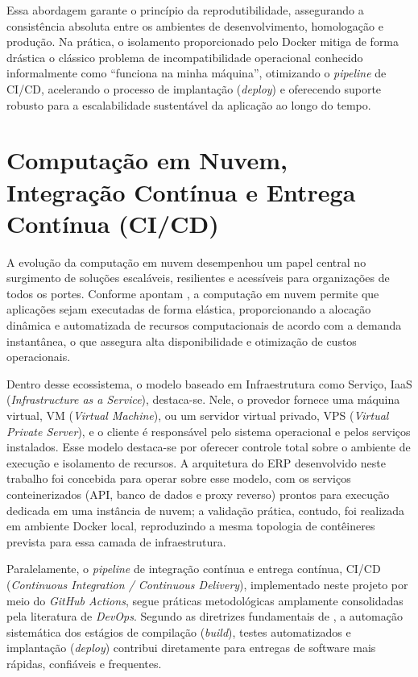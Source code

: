 Essa abordagem garante o princípio da reprodutibilidade, assegurando a consistência absoluta entre os ambientes de desenvolvimento, homologação e produção. Na prática, o isolamento proporcionado pelo Docker mitiga de forma drástica o clássico problema de incompatibilidade operacional conhecido informalmente como ``funciona na minha máquina'', otimizando o \textit{pipeline} de CI/CD, acelerando o processo de implantação (\textit{deploy}) e oferecendo suporte robusto para a escalabilidade sustentável da aplicação ao longo do tempo.

\section{Computação em Nuvem, Integração Contínua e Entrega Contínua (CI/CD)}

A evolução da computação em nuvem desempenhou um papel central no surgimento de soluções escaláveis, resilientes e acessíveis para organizações de todos os portes. Conforme apontam , a computação em nuvem permite que aplicações sejam executadas de forma elástica, proporcionando a alocação dinâmica e automatizada de recursos computacionais de acordo com a demanda instantânea, o que assegura alta disponibilidade e otimização de custos operacionais. 

Dentro desse ecossistema, o modelo baseado em Infraestrutura como Serviço, IaaS (\textit{Infrastructure as a Service}), destaca-se. Nele, o provedor fornece uma máquina virtual, VM (\textit{Virtual Machine}), ou um servidor virtual privado, VPS (\textit{Virtual Private Server}), e o cliente é responsável pelo sistema operacional e pelos serviços instalados. Esse modelo destaca-se por oferecer controle total sobre o ambiente de execução e isolamento de recursos. A arquitetura do ERP desenvolvido neste trabalho foi concebida para operar sobre esse modelo, com os serviços conteinerizados (API, banco de dados e proxy reverso) prontos para execução dedicada em uma instância de nuvem; a validação prática, contudo, foi realizada em ambiente Docker local, reproduzindo a mesma topologia de contêineres prevista para essa camada de infraestrutura.

Paralelamente, o \textit{pipeline} de integração contínua e entrega contínua, CI/CD (\textit{Continuous Integration / Continuous Delivery}), implementado neste projeto por meio do \textit{GitHub Actions}, segue práticas metodológicas amplamente consolidadas pela literatura de \textit{DevOps}. Segundo as diretrizes fundamentais de , a automação sistemática dos estágios de compilação (\textit{build}), testes automatizados e implantação (\textit{deploy}) contribui diretamente para entregas de software mais rápidas, confiáveis e frequentes. 

